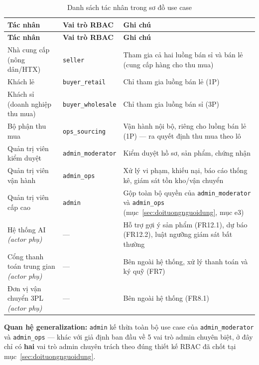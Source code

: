 \begingroup
\small
\renewcommand{\arraystretch}{1.25}
\begin{longtable}{L{4.0cm} L{3.0cm} L{6.5cm}}
\caption{Danh sách tác nhân trong sơ đồ use case}
\label{tab:actor-usecase} \\
\toprule
{}
\textbf{Tác nhân} & \textbf{Vai trò RBAC} & \textbf{Ghi chú} \\
\midrule
\endfirsthead
\toprule
{}
\textbf{Tác nhân} & \textbf{Vai trò RBAC} & \textbf{Ghi chú} \\
\midrule
\endhead
\bottomrule
\endfoot
Nhà cung cấp (nông dân/HTX) & \texttt{seller} & Tham gia cả hai luồng bán sỉ và bán lẻ (cung cấp hàng cho thu mua) \\
Khách lẻ & \texttt{buyer\_retail} & Chỉ tham gia luồng bán lẻ (1P) \\
Khách sỉ (doanh nghiệp thu mua) & \texttt{buyer\_wholesale} & Chỉ tham gia luồng bán sỉ (3P) \\
Bộ phận thu mua & \texttt{ops\_sourcing} & Vận hành nội bộ, riêng cho luồng bán lẻ (1P) --- ra quyết định thu mua theo lô \\
Quản trị viên kiểm duyệt & \texttt{admin\_moderator} & Kiểm duyệt hồ sơ, sản phẩm, chứng nhận \\
Quản trị viên vận hành & \texttt{admin\_ops} & Xử lý vi phạm, khiếu nại, báo cáo thống kê, giám sát tồn kho/vận chuyển \\
Quản trị viên cấp cao & \texttt{admin} & Gộp toàn bộ quyền của \texttt{admin\_moderator} và \texttt{admin\_ops} (mục~\ref{sec:doituongnguoidung}, mục e3) \\
Hệ thống AI \textit{(actor phụ)} & --- & Hỗ trợ gợi ý sản phẩm (FR12.1), dự báo (FR12.2), luật ngưỡng giám sát bất thường \\
Cổng thanh toán trung gian \textit{(actor phụ)} & --- & Bên ngoài hệ thống, xử lý thanh toán và ký quỹ (FR7) \\
Đơn vị vận chuyển 3PL \textit{(actor phụ)} & --- & Bên ngoài hệ thống (FR8.1) \\
\end{longtable}
\endgroup

\noindent\textbf{Quan hệ generalization:} \texttt{admin} kế thừa toàn bộ use case của \texttt{admin\_moderator} và \texttt{admin\_ops} --- khác với giả định ban đầu về 5 vai trò admin chuyên biệt, ở đây chỉ có \textbf{hai} vai trò admin chuyên trách theo đúng thiết kế RBAC đã chốt tại mục~\ref{sec:doituongnguoidung}.

